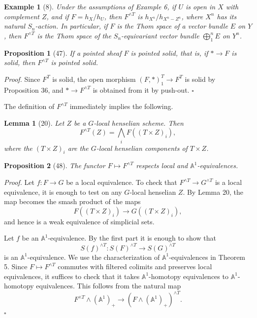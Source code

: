 \documentclass[11pt]{article}
\newcommand{\Aone}{\mathbb A^1}
\newcommand{\pt}{*}
\theoremstyle{deligne}
\newtheorem*{proposition*}{Proposition}
\newtheorem*{lemma*}{Lemma}
\newtheorem*{example*}{Example}
\newenvironment{proofdel}{\noindent\textit{Proof.}}{\hfill$\square$}
\begin{document}
\begin{example*}[8]
Under the assumptions of Example 6, if \(U\) is open in \(X\) with complement \(Z\), and if \(F=h_X/h_U\), then \(F^{\wedge T}\) is \(h_{X^n}/h_{X^n-Z^n}\), where \(X^n\) has its natural \(S_n\)-action. In particular, if \(F\) is the Thom space of a vector bundle \(E\) on \(Y\), then \(F^{\wedge T}\) is the Thom space of the \(S_n\)-equivariant vector bundle \(\bigoplus_1^n E\) on \(Y^n\).
\end{example*}

\begin{proposition*}[47]
If a pointed sheaf \(F\) is pointed solid, that is, if \(\pt\to F\) is solid, then \(F^{\wedge T}\) is pointed solid.
\end{proposition*}

\begin{proofdel}
Since \(F^T\) is solid, the open morphism \((F,\pt)^T_1\to F^T\) is solid by Proposition 36, and \(\pt\to F^{\wedge T}\) is obtained from it by push-out.
\end{proofdel}

The definition of \(F^{\wedge T}\) immediately implies the following.

\begin{lemma*}[20]
Let \(Z\) be a \(G\)-local henselian scheme. Then
\[
F^{\wedge T}(Z)=\bigwedge_i F((T\times Z)_i),
\]
where the \((T\times Z)_i\) are the \(G\)-local henselian components of \(T\times Z\).
\end{lemma*}

\begin{proposition*}[48]
The functor \(F\mapsto F^{\wedge T}\) respects local and \(\Aone\)-equivalences.
\end{proposition*}

\begin{proofdel}
Let \(f:F\to G\) be a local equivalence. To check that \(F^{\wedge T}\to G^{\wedge T}\) is a local equivalence, it is enough to test on any \(G\)-local henselian \(Z\). By Lemma 20, the map becomes the smash product of the maps
\[
F((T\times Z)_i)\longrightarrow G((T\times Z)_i),
\]
and hence is a weak equivalence of simplicial sets.

Let \(f\) be an \(\Aone\)-equivalence. By the first part it is enough to show that
\[
S(f)^{\wedge T}: S(F)^{\wedge T}\longrightarrow S(G)^{\wedge T}
\]
is an \(\Aone\)-equivalence. We use the characterization of \(\Aone\)-equivalences in Theorem 5. Since \(F\mapsto F^{\wedge T}\) commutes with filtered colimits and preserves local equivalences, it suffices to check that it takes \(\Aone\)-homotopy equivalences to \(\Aone\)-homotopy equivalences. This follows from the natural map
\[
F^{\wedge T}\wedge(\Aone)_+\longrightarrow (F\wedge(\Aone)_+)^{\wedge T}.
\]
\end{proofdel}
\end{document}
